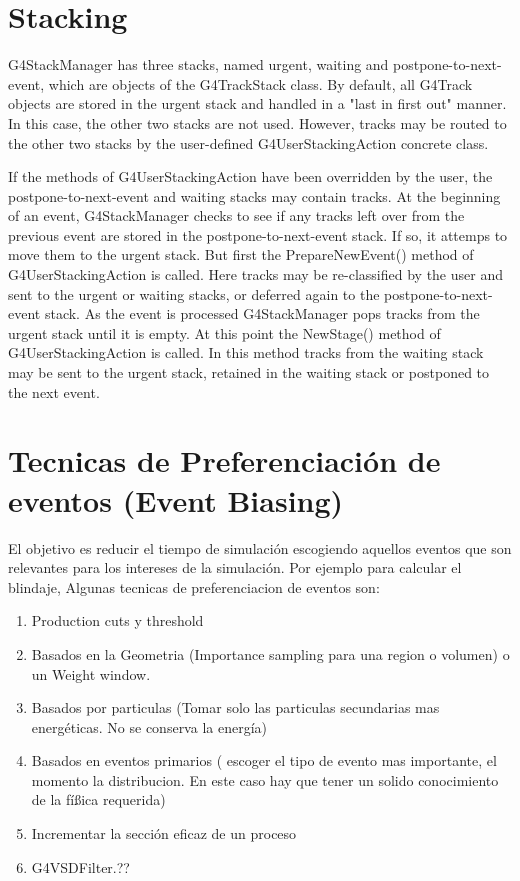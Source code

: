\documentclass[10pt,a4paper,oneside]{book}
\begin{document}
\section*{Stacking}
G4StackManager has three stacks, named urgent, waiting and
postpone-to-next-event, which are objects of the G4TrackStack
class. By default, all G4Track objects are stored in the urgent stack
and handled in a "last in first out" manner. In this case, the other
two stacks are not used. However, tracks may be routed to the other
two stacks by the user-defined G4UserStackingAction concrete class.

If the methods of G4UserStackingAction have been overridden by the
user, the postpone-to-next-event and waiting stacks may contain
tracks. At the beginning of an event, G4StackManager checks to see if
any tracks left over from the previous event are stored in the
postpone-to-next-event stack. If so, it attemps to move them to the
urgent stack. But first the PrepareNewEvent() method of
G4UserStackingAction is called. Here tracks may be re-classified by
the user and sent to the urgent or waiting stacks, or deferred again
to the postpone-to-next-event stack. As the event is processed
G4StackManager pops tracks from the urgent stack until it is empty. At
this point the NewStage() method of G4UserStackingAction is called. In
this method tracks from the waiting stack may be sent to the urgent
stack, retained in the waiting stack or postponed to the next event.

\section*{Tecnicas de Preferenciación de eventos (Event Biasing)}
El objetivo es reducir el tiempo de simulación escogiendo aquellos
eventos que son relevantes para los intereses de la simulación. Por
ejemplo para calcular el blindaje, Algunas tecnicas de preferenciacion
de eventos son:
\begin{enumerate}
\item Production cuts y threshold
\item Basados en la Geometria (Importance sampling para una region o
  volumen) o un Weight window.
\item Basados por particulas (Tomar solo las particulas secundarias
  mas energéticas. No se conserva la energía)
\item Basados en eventos primarios ( escoger el tipo de evento mas
  importante, el momento la distribucion. En este caso hay que tener
  un solido conocimiento de la fíßica requerida)
\item Incrementar la sección eficaz de un proceso
\item G4VSDFilter.??
\end{enumerate}
\end{document}
